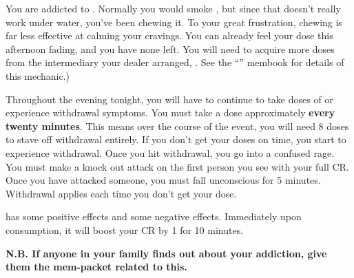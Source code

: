 \documentclass[green]{NeptuneBall}
\begin{document}
\name{\gAddicted{}}

You are addicted to \iDrug{}. Normally you would smoke \iDrug{}, but since that doesn't really work under water, you've been chewing it. To your great frustration, chewing is far less effective at calming your cravings. You can already feel your dose this afternoon fading, and you have none left. You will need to acquire more doses from the intermediary your dealer arranged, \cReporter{}. See the ``\mSpyBook{}'' membook for details of this mechanic.)

Throughout the evening tonight, you will have to continue to take doses of \iDrug{} or experience withdrawal symptoms. You must take a dose approximately \textbf{every twenty minutes}. This means over the course of the event, you will need 8 doses to stave off withdrawal entirely. If you don't get your doses on time, you start to experience withdrawal. Once you hit withdrawal, you go into a confused rage. You must make a knock out attack on the first person you see with your full CR. Once you have attacked someone, you must fall unconscious for 5 minutes. Withdrawal applies each time you don't get your dose.

\iDrug{} has some positive effects and some negative effects. Immediately upon consumption, it will boost your CR by 1 for 10 minutes.

{\bf N.B. If anyone in your family finds out about your addiction, give them the mem-packet related to this.}
\end{document}
